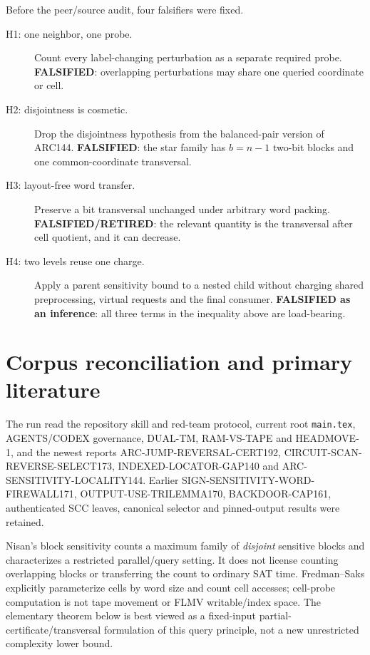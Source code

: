\documentclass[11pt]{article}
\begin{document}
Before the peer/source audit, four falsifiers were fixed.
\begin{description}
\item[H1: one neighbor, one probe.]  Count every label-changing perturbation
as a separate required probe.  \textbf{FALSIFIED}: overlapping perturbations
may share one queried coordinate or cell.
\item[H2: disjointness is cosmetic.]  Drop the disjointness hypothesis from
the balanced-pair version of ARC144.  \textbf{FALSIFIED}: the star family has
$b=n-1$ two-bit blocks and one common-coordinate transversal.
\item[H3: layout-free word transfer.]  Preserve a bit transversal unchanged
under arbitrary word packing.  \textbf{FALSIFIED/RETIRED}: the relevant
quantity is the transversal after cell quotient, and it can decrease.
\item[H4: two levels reuse one charge.]  Apply a parent sensitivity bound to
a nested child without charging shared preprocessing, virtual requests and
the final consumer.  \textbf{FALSIFIED as an inference}: all three terms in
the inequality above are load-bearing.
\end{description}

\section{Corpus reconciliation and primary literature}
The run read the repository skill and red-team protocol, current root
\texttt{main.tex}, AGENTS/CODEX governance, DUAL-TM, RAM-VS-TAPE and HEADMOVE-1,
and the newest reports ARC-JUMP-REVERSAL-CERT192,
CIRCUIT-SCAN-REVERSE-SELECT173, INDEXED-LOCATOR-GAP140 and
ARC-SENSITIVITY-LOCALITY144.  Earlier SIGN-SENSITIVITY-WORD-FIREWALL171,
OUTPUT-USE-TRILEMMA170, BACKDOOR-CAP161, authenticated SCC leaves, canonical
selector and pinned-output results were retained.

Nisan's block sensitivity counts a maximum family of \emph{disjoint}
sensitive blocks and characterizes a restricted parallel/query setting.  It
does not license counting overlapping blocks or transferring the count to
ordinary SAT time.  Fredman--Saks explicitly parameterize cells by word
size and count cell accesses; cell-probe computation is not tape movement or
FLMV writable/index space.  The elementary theorem below is best viewed as a
fixed-input partial-certificate/transversal formulation of this query
principle, not a new unrestricted complexity lower bound.
\end{document}
